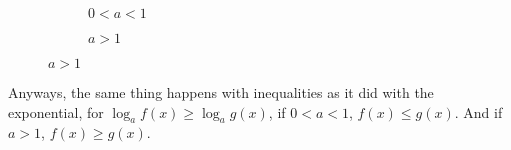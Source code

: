 \begin{figure}
    [H]
    \centering 
    \begin{subfigure}{0.5\textwidth}
        \caption{\(0 < a < 1\)}
    \end{subfigure}%
    \begin{subfigure}{0.5\textwidth}
        \caption{\(a > 1\)}
    \end{subfigure}
\end{figure}

Anyways, the same thing happens with inequalities as it did with the exponential,
for \(\log_{a}f(x) \ge \log_{a} g(x)\), if \(0 < a < 1\), \(f(x) \le g(x)\). And if
\(a > 1\), \(f(x) \ge g(x)\). 

